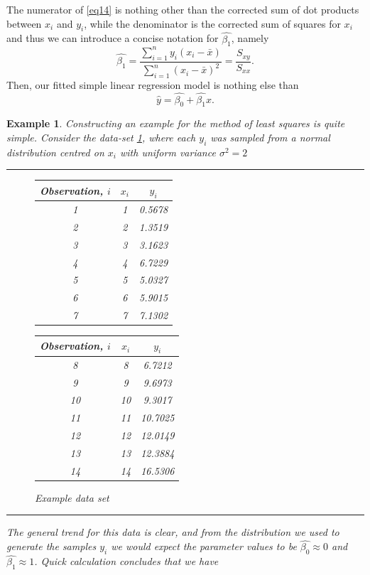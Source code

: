 \documentclass[10pt,a4paper]{article}
\numberwithin{equation}{section}
\theoremstyle{plain}
\theoremstyle{own}
\newtheorem{example}{Example}[section]
\begin{document}
The numerator of \cref{eq14} is nothing other than the corrected sum of dot products between $x_i$ and $y_i$, while the denominator is the corrected sum of squares for $x_i$ and thus we can introduce a concise notation for $\hat{\beta_1}$, namely
\begin{equation}
\hat{\beta_1} = \frac{\sum_{i=1}^n y_i (x_i - \bar{x})}{\sum_{i=1}^n (x_i - \bar{x})^2} = \frac{S_{xy}}{S_{xx}}.
\end{equation}
Then, our fitted simple linear regression model is nothing else than
\begin{equation}
\hat{y} = \hat{\beta_0} + \hat{\beta_1} x.
\end{equation}
\begin{example} \label{example31}
Constructing an example for the method of least squares is quite simple. Consider the data-set \cref{fig:dat}, where each $y_i$ was sampled from a normal distribution centred on $x_i$ with uniform variance $\sigma^2 = 2$
\vspace{2mm}
\hrule
\begin{figure}[H]
\centering
\begin{tabular}{c|c|c}
Observation, $i$ & $x_i$ & $y_i$ \\
\hline
\hline
1 &1&0.5678 \\
2 &2&1.3519 \\
3 &3&3.1623 \\
4 &4&6.7229 \\
5 &5&5.0327 \\
6 &6&5.9015 \\
7 &7&7.1302 \\
\end{tabular}
\quad
\quad
\quad
\quad
\begin{tabular}{c|c|c}
Observation, $i$ & $x_i$ & $y_i$ \\
\hline
\hline
8 &8&6.7212 \\
9 &9&9.6973 \\
10 &10&9.3017 \\
11 &11&10.7025 \\
12 &12&12.0149 \\
13 &13&12.3884 \\
14 &14& 16.5306\\
\end{tabular}
\caption{\small{Example data set}}
\label{fig:dat}
\end{figure}
\hrule
\vspace{2mm}
The general trend for this data is clear, and from the distribution we used to generate the samples $y_i$ we would expect the parameter values to be $\hat{\beta_0} \approx 0$ and $\hat{\beta_1} \approx 1$. Quick calculation concludes that we have

\end{example}
\end{document}

